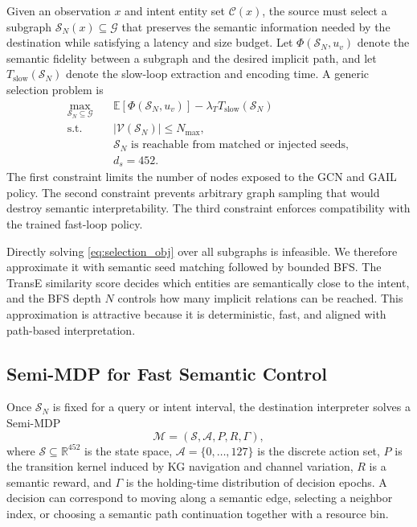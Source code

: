 \documentclass[journal]{IEEEtran}
\newcommand{\KG}{\mathcal{G}}
\newcommand{\SG}{\mathcal{S}}
\newcommand{\calA}{\mathcal{A}}
\newcommand{\calC}{\mathcal{C}}
\newcommand{\calV}{\mathcal{V}}
\newcommand{\bbE}{\mathbb{E}}
\newcommand{\R}{\mathbb{R}}
\begin{document}
Given an observation $x$ and intent entity set $\calC(x)$, the source must select a subgraph $\SG_N(x)\subseteq \KG$ that preserves the semantic information needed by the destination while satisfying a latency and size budget. Let $\Phi(\SG_N,u_v)$ denote the semantic fidelity between a subgraph and the desired implicit path, and let $T_{\mathrm{slow}}(\SG_N)$ denote the slow-loop extraction and encoding time. A generic selection problem is
\begin{align}
\max_{\SG_N\subseteq\KG}\quad
& \bbE[\Phi(\SG_N,u_v)]-\lambda_T T_{\mathrm{slow}}(\SG_N) \label{eq:selection_obj}\\
\mathrm{s.t.}\quad
& |\calV(\SG_N)|\leq N_{\max}, \\
& \SG_N \text{ is reachable from matched or injected seeds},\\
& d_s=452 .
\end{align}
The first constraint limits the number of nodes exposed to the GCN and GAIL policy. The second constraint prevents arbitrary graph sampling that would destroy semantic interpretability. The third constraint enforces compatibility with the trained fast-loop policy.

Directly solving \eqref{eq:selection_obj} over all subgraphs is infeasible. We therefore approximate it with semantic seed matching followed by bounded BFS. The TransE similarity score decides which entities are semantically close to the intent, and the BFS depth $N$ controls how many implicit relations can be reached. This approximation is attractive because it is deterministic, fast, and aligned with path-based interpretation.

\subsection{Semi-MDP for Fast Semantic Control}

Once $\SG_N$ is fixed for a query or intent interval, the destination interpreter solves a Semi-MDP \cite{puterman1994mdp}
\begin{equation}
\mathcal{M}=(\mathcal{S},\calA,P,R,\Gamma),
\end{equation}
where $\mathcal{S}\subseteq\R^{452}$ is the state space, $\calA=\{0,\ldots,127\}$ is the discrete action set, $P$ is the transition kernel induced by KG navigation and channel variation, $R$ is a semantic reward, and $\Gamma$ is the holding-time distribution of decision epochs. A decision can correspond to moving along a semantic edge, selecting a neighbor index, or choosing a semantic path continuation together with a resource bin.
\end{document}

